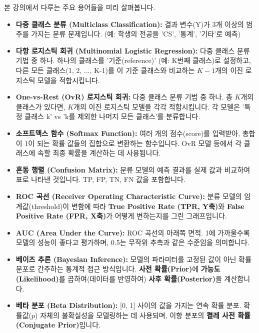 \documentclass[11pt,a4paper]{book}
\theoremstyle{definition}
\begin{document}
본 강의에서 다루는 주요 용어들을 미리 살펴봅니다.

\begin{defbox}[title=주요 용어]
\begin{itemize}
    \item \textbf{다중 클래스 분류 (Multiclass Classification):}
    결과 변수(Y)가 3개 이상의 범주를 가지는 분류 문제입니다. (예: 학생의 전공을 'CS', '통계', '기타'로 예측)
    
    \item \textbf{다항 로지스틱 회귀 (Multinomial Logistic Regression):}
    다중 클래스 분류 기법 중 하나. 하나의 클래스를 '기준(reference)' (예: K번째 클래스)로 설정하고, 다른 모든 클래스(1, 2, ..., K-1)를 이 기준 클래스와 비교하는 $K-1$개의 이진 로지스틱 모델을 적합시킵니다.
    
    \item \textbf{One-vs-Rest (OvR) 로지스틱 회귀:}
    다중 클래스 분류 기법 중 하나. 총 $K$개의 클래스가 있다면, $K$개의 이진 로지스틱 모델을 각각 적합시킵니다. 각 모델은 '특정 클래스 k' vs 'k를 제외한 나머지 모든 클래스'를 분류합니다.
    
    \item \textbf{소프트맥스 함수 (Softmax Function):}
    여러 개의 점수(score)를 입력받아, 총합이 1이 되는 확률 값들의 집합으로 변환하는 함수입니다. OvR 모델 등에서 각 클래스에 속할 최종 확률을 계산하는 데 사용됩니다.
    
    \item \textbf{혼동 행렬 (Confusion Matrix):}
    분류 모델의 예측 결과를 실제 값과 비교하여 표로 나타낸 것입니다. TP, FP, TN, FN 값을 포함합니다.
    
    \item \textbf{ROC 곡선 (Receiver Operating Characteristic Curve):}
    분류 모델의 임계값(threshold)이 변함에 따라 \textbf{True Positive Rate (TPR, Y축)}와 \textbf{False Positive Rate (FPR, X축)}가 어떻게 변하는지를 그린 그래프입니다.
    
    \item \textbf{AUC (Area Under the Curve):}
    ROC 곡선의 아래쪽 면적. 1에 가까울수록 모델의 성능이 좋다고 평가하며, 0.5는 무작위 추측과 같은 수준임을 의미합니다.
    
    \item \textbf{베이즈 추론 (Bayesian Inference):}
    모델의 파라미터를 고정된 값이 아닌 확률 분포로 간주하는 통계적 접근 방식입니다. \textbf{사전 확률(Prior)}에 \textbf{가능도(Likelihood)}를 곱하여(데이터를 반영하여) \textbf{사후 확률(Posterior)}을 계산합니다.
    
    \item \textbf{베타 분포 (Beta Distribution):}
    [0, 1] 사이의 값을 가지는 연속 확률 분포. 확률값($p$) 자체의 불확실성을 모델링하는 데 사용되며, 이항 분포의 \textbf{켤레 사전 확률(Conjugate Prior)}입니다.
\end{itemize}
\end{defbox}
\end{document}
